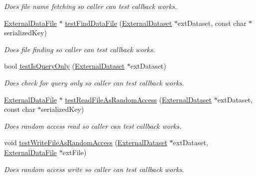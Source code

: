 \begin{DoxyCompactItemize}
\begin{DoxyCompactList}\small\item\em Does file name fetching so caller can test callback works. \item\end{DoxyCompactList}\item 
\hyperlink{classBUSBOY_1_1ExternalDataFile}{ExternalDataFile} $\ast$ \hyperlink{classBUSBOY_1_1ExternalEntry_a5a52813093215ab59a91d012255cbba6}{testFindDataFile} (\hyperlink{classBUSBOY_1_1ExternalDataset}{ExternalDataset} $\ast$extDataset, const char $\ast$serializedKey)
\begin{DoxyCompactList}\small\item\em Does file finding so caller can test callback works. \item\end{DoxyCompactList}\item 
bool \hyperlink{classBUSBOY_1_1ExternalEntry_a84e84bbd282bd8a16656e9c842275305}{testIsQueryOnly} (\hyperlink{classBUSBOY_1_1ExternalDataset}{ExternalDataset} $\ast$extDataset)
\begin{DoxyCompactList}\small\item\em Does check for query only so caller can test callback works. \item\end{DoxyCompactList}\item 
\hyperlink{classBUSBOY_1_1ExternalDataFile}{ExternalDataFile} $\ast$ \hyperlink{classBUSBOY_1_1ExternalEntry_ae3aed65cc3c2de18595decdaae55e40a}{testReadFileAsRandomAccess} (\hyperlink{classBUSBOY_1_1ExternalDataset}{ExternalDataset} $\ast$extDataset, const char $\ast$serializedKey)
\begin{DoxyCompactList}\small\item\em Does random access read so caller can test callback works. \item\end{DoxyCompactList}\item 
void \hyperlink{classBUSBOY_1_1ExternalEntry_afd1490faaaab28027da0eb0cc9118ef2}{testWriteFileAsRandomAccess} (\hyperlink{classBUSBOY_1_1ExternalDataset}{ExternalDataset} $\ast$extDataset, \hyperlink{classBUSBOY_1_1ExternalDataFile}{ExternalDataFile} $\ast$extFile)
\begin{DoxyCompactList}\small\item\em Does random access write so caller can test callback works. \item\end{DoxyCompactList}\item 

\end{DoxyCompactItemize}
